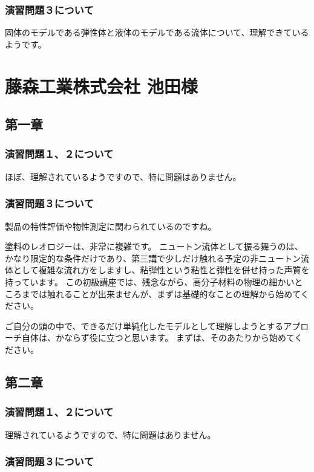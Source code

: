 \documentclass[uplatex,dvipdfmx,a4paper,11pt]{jsreport}
\begin{document}
\subsubsection*{演習問題３について}

固体のモデルである弾性体と液体のモデルである流体について、理解できているようです。

\clearpage

\section*{藤森工業株式会社 池田様}
\subsection*{第一章}
\subsubsection*{演習問題１、２について}
ほぼ、理解されているようですので、特に問題はありません。

\subsubsection*{演習問題３について}

製品の特性評価や物性測定に関わられているのですね。

塗料のレオロジーは、非常に複雑です。
ニュートン流体として振る舞うのは、かなり限定的な条件だけであり、第三講で少しだけ触れる予定の非ニュートン流体として複雑な流れ方をしますし、粘弾性という粘性と弾性を併せ持った声質を持っています。
この初級講座では、残念ながら、高分子材料の物理の細かいところまでは触れることが出来ませんが、まずは基礎的なことの理解から始めてください。

ご自分の頭の中で、できるだけ単純化したモデルとして理解しようとするアプローチ自体は、かならず役に立つと思います。
まずは、そのあたりから始めてください。

\subsection*{第二章}
\subsubsection*{演習問題１、２について}
理解されているようですので、特に問題はありません。

\subsubsection*{演習問題３について}
\end{document}
